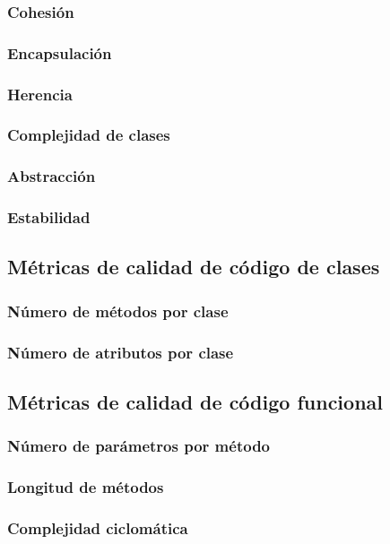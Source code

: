 \documentclass[11pt]{article}
\begin{document}
\subsubsection{Cohesión}
\subsubsection{Encapsulación}
\subsubsection{Herencia}
\subsubsection{Complejidad de clases}
\subsubsection{Abstracción}
\subsubsection{Estabilidad}

\subsection{Métricas de calidad de código de clases}
\subsubsection{Número de métodos por clase}
\subsubsection{Número de atributos por clase}

\subsection{Métricas de calidad de código funcional}
\subsubsection{Número de parámetros por método}
\subsubsection{Longitud de métodos}
\subsubsection{Complejidad ciclomática}
\end{document}
